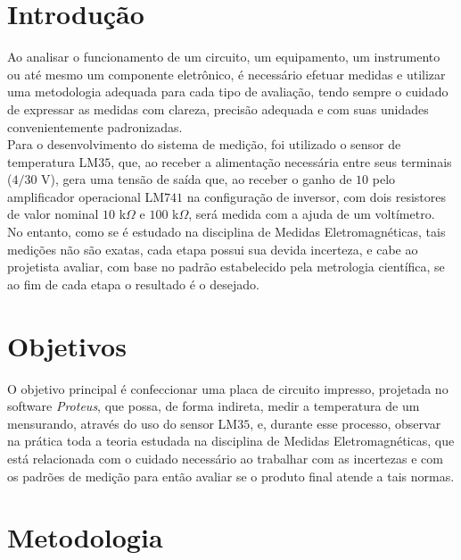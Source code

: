 \documentclass[14pt, oneside]{book}
\newcommand\tab[1][1cm]{\hspace*{#1}}
\theoremstyle{definition}
\begin{document}
    \tableofcontents
    
        \chapter{Introdução}
            \tab Ao analisar o funcionamento de um circuito, um equipamento, um instrumento ou até mesmo um componente eletrônico, é necessário efetuar medidas e utilizar uma metodologia adequada para cada tipo de avaliação, tendo sempre o cuidado de expressar as medidas com clareza, precisão adequada e com suas unidades convenientemente padronizadas. \\
            \tab Para o desenvolvimento do sistema de medição, foi utilizado o sensor de temperatura LM$35$, que, ao receber a alimentação necessária entre seus terminais ($4/30$ V), gera uma tensão de saída que, ao receber o ganho de $10$ pelo amplificador operacional LM$741$ na configuração de inversor, com dois resistores de valor nominal $10$ k$\Omega$ e $100$ k$\Omega$, será medida com a ajuda de um voltímetro. \\
            \tab No entanto, como se é estudado na disciplina de Medidas Eletromagnéticas, tais medições não são exatas, cada etapa possui sua devida incerteza, e cabe ao projetista avaliar, com base no padrão estabelecido pela metrologia científica, se ao fim de cada etapa o resultado é o desejado.
              
        \chapter{Objetivos}
            \tab O objetivo principal é confeccionar uma placa de circuito impresso, projetada no software \textit{Proteus}, que possa, de forma indireta, medir a temperatura de um mensurando, através do uso do sensor LM$35$, e, durante esse processo, observar na prática toda a teoria estudada na disciplina de Medidas Eletromagnéticas, que está relacionada com o cuidado necessário ao trabalhar com as incertezas e com os padrões de medição para então avaliar se o produto final atende a tais normas.
            
         \chapter{Metodologia}
\end{document}
